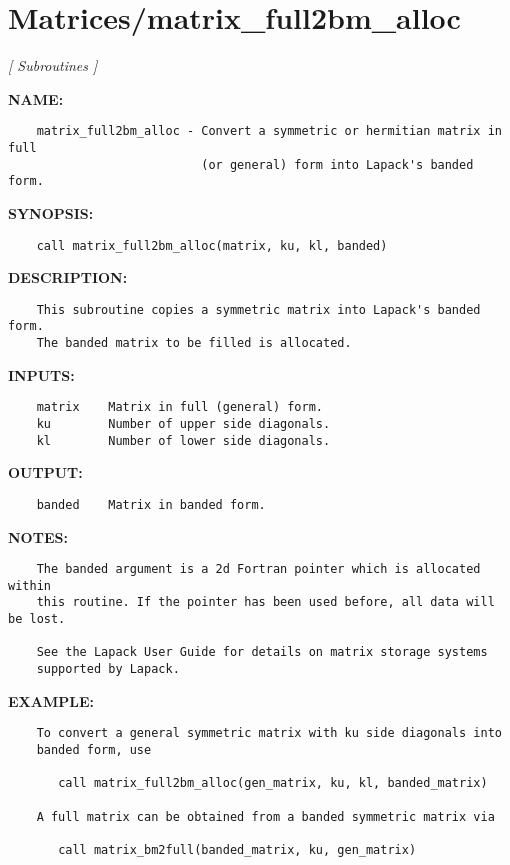 \section{Matrices/matrix\_full2bm\_alloc}
\textsl{[ Subroutines ]}

\label{ch:robo19}
\label{ch:Matrices_matrix_full2bm_alloc}
\textbf{NAME:}\hspace{0.08in}\begin{Verbatim}
    matrix_full2bm_alloc - Convert a symmetric or hermitian matrix in full
                           (or general) form into Lapack's banded form.
\end{Verbatim}
\textbf{SYNOPSIS:}\hspace{0.08in}\begin{Verbatim}
    call matrix_full2bm_alloc(matrix, ku, kl, banded)
\end{Verbatim}
\textbf{DESCRIPTION:}\hspace{0.08in}\begin{Verbatim}
    This subroutine copies a symmetric matrix into Lapack's banded form. 
    The banded matrix to be filled is allocated.
\end{Verbatim}
\textbf{INPUTS:}\hspace{0.08in}\begin{Verbatim}
    matrix    Matrix in full (general) form.
    ku        Number of upper side diagonals.
    kl        Number of lower side diagonals.
\end{Verbatim}
\textbf{OUTPUT:}\hspace{0.08in}\begin{Verbatim}
    banded    Matrix in banded form.
\end{Verbatim}
\textbf{NOTES:}\hspace{0.08in}\begin{Verbatim}
    The banded argument is a 2d Fortran pointer which is allocated within
    this routine. If the pointer has been used before, all data will be lost.

    See the Lapack User Guide for details on matrix storage systems 
    supported by Lapack. 
\end{Verbatim}
\textbf{EXAMPLE:}\hspace{0.08in}\begin{Verbatim}
    To convert a general symmetric matrix with ku side diagonals into 
    banded form, use

       call matrix_full2bm_alloc(gen_matrix, ku, kl, banded_matrix)

    A full matrix can be obtained from a banded symmetric matrix via

       call matrix_bm2full(banded_matrix, ku, gen_matrix)
\end{Verbatim}
